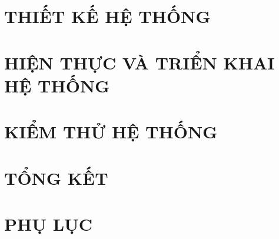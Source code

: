 \documentclass[a4paper,12pt,oneside]{report}
\begin{document}
\chapter{THIẾT KẾ HỆ THỐNG}
\renewcommand*{\theHsection}{\theHchapter.\the\value{section}}


\chapter{HIỆN THỰC VÀ TRIỂN KHAI HỆ THỐNG}
\renewcommand*{\theHsection}{\theHchapter.\the\value{section}}


\chapter{KIỂM THỬ HỆ THỐNG}
\label{chap:testing}
\renewcommand*{\theHsection}{\theHchapter.\the\value{section}}


% 

% 

\chapter{TỔNG KẾT}
\renewcommand*{\theHsection}{\theHchapter.\the\value{section}}


\renewcommand{\bibname}{TÀI LIỆU THAM KHẢO}
\renewcommand*{\theHsection}{\the\value{section}}


\appendix
\chapter{PHỤ LỤC}
\renewcommand*{\theHsection}{\theHchapter.\the\value{section}}


\end{document}
